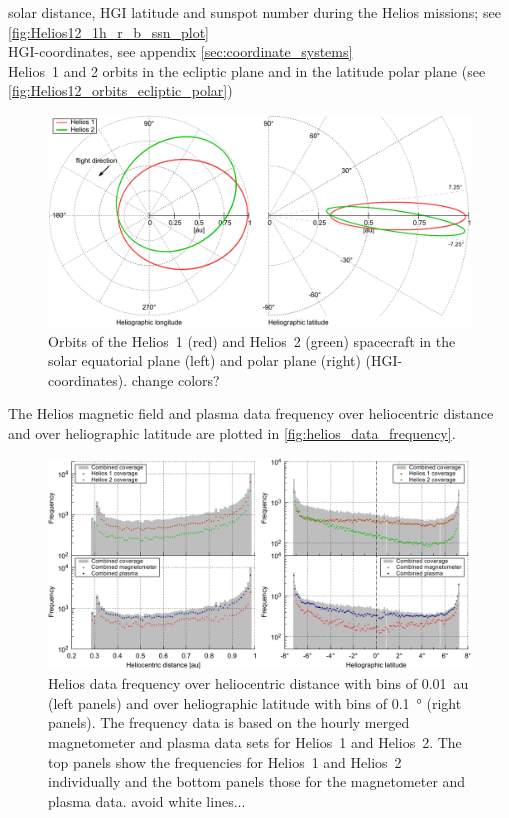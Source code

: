 solar distance, HGI latitude and sunspot number during the Helios missions; see \autoref{fig:Helios12_1h_r_b_ssn_plot}\\
HGI-coordinates, see appendix \autoref{sec:coordinate_systems}\\

Helios~1 and 2 orbits in the ecliptic plane and in the latitude polar plane (see \autoref{fig:Helios12_orbits_ecliptic_polar})\\
\begin{figure}[htb]
	\centering
	\includegraphics[width=\textwidth]{images/gnuplots/Helios12_orbits_ecliptic_polar.pdf}
	\caption{Orbits of the Helios~1 (red) and Helios~2 (green) spacecraft in the solar equatorial plane (left) and polar plane (right) (HGI-coordinates). change colors?}
	\label{fig:Helios12_orbits_ecliptic_polar}
\end{figure}

The Helios magnetic field and plasma data frequency over heliocentric distance and over heliographic latitude are plotted in \autoref{fig:helios_data_frequency}.\\
\begin{figure}[htb]
	\centering
	\includegraphics[width=\textwidth]{images/gnuplots/helios_data_frequency.pdf}
	\caption{Helios data frequency over heliocentric distance with bins of \SI{0.01}{au} (left panels) and over heliographic latitude with bins of \SI{0.1}{\degree} (right panels). The frequency data is based on the hourly merged magnetometer and plasma data sets for Helios~1 and Helios~2. The top panels show the frequencies for Helios~1 and Helios~2 individually and the bottom panels those for the magnetometer and plasma data. avoid white lines...}
	\label{fig:helios_data_frequency}
\end{figure}

